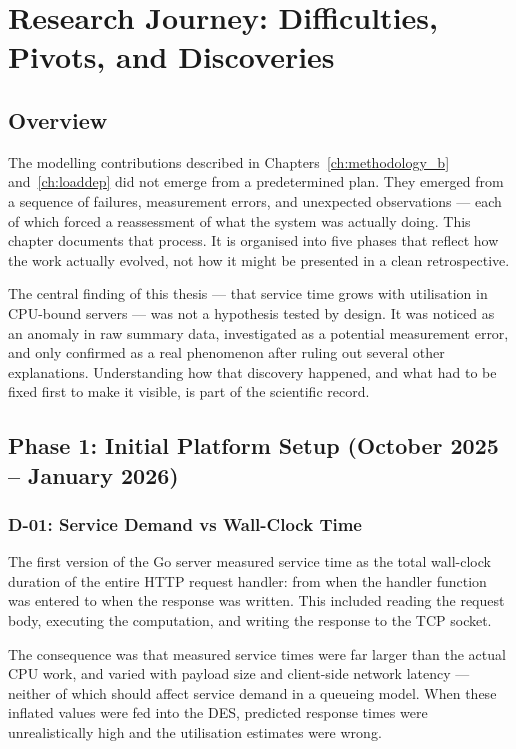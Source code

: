 \chapter{Research Journey: Difficulties, Pivots, and Discoveries}
\label{ch:journey}

\section{Overview}

The modelling contributions described in Chapters~\ref{ch:methodology_b} and~\ref{ch:loaddep} did not emerge from a predetermined plan. They emerged from a sequence of failures, measurement errors, and unexpected observations — each of which forced a reassessment of what the system was actually doing. This chapter documents that process. It is organised into five phases that reflect how the work actually evolved, not how it might be presented in a clean retrospective.

The central finding of this thesis — that service time grows with utilisation in CPU-bound servers — was not a hypothesis tested by design. It was noticed as an anomaly in raw summary data, investigated as a potential measurement error, and only confirmed as a real phenomenon after ruling out several other explanations. Understanding how that discovery happened, and what had to be fixed first to make it visible, is part of the scientific record.

\section{Phase 1: Initial Platform Setup (October 2025 -- January 2026)}
\label{sec:journey-phase1}

\subsection{D-01: Service Demand vs Wall-Clock Time}

The first version of the Go server measured service time as the total wall-clock duration of the entire HTTP request handler: from when the handler function was entered to when the response was written. This included reading the request body, executing the computation, and writing the response to the TCP socket.

The consequence was that measured service times were far larger than the actual CPU work, and varied with payload size and client-side network latency — neither of which should affect service demand in a queueing model. When these inflated values were fed into the DES, predicted response times were unrealistically high and the utilisation estimates were wrong.

